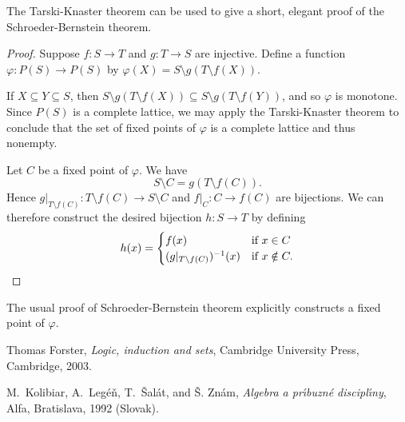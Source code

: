 \documentclass[12pt]{article}
\begin{document}
The Tarski-Knaster theorem can be used to give a short, elegant proof of the Schroeder-Bernstein theorem.

\begin{proof}
Suppose $f:S\to T$ and $g:T\to S$ are injective.  Define a function $\varphi\colon P(S)\to P(S)$
by $\varphi(X)=S\setminus g(T\setminus f(X))$.

If $X\subseteq Y\subseteq S$, then $S\setminus g(T\setminus f(X))\subseteq S\setminus g(T\setminus f(Y))$, and so $\varphi$ is monotone.  Since $P(S)$ is a complete lattice, we may apply the Tarski-Knaster theorem to conclude that the set of fixed points of $\varphi$ is a complete lattice and thus nonempty.

Let $C$ be a fixed point of $\varphi$.  We have
\[
S\setminus C=g(T\setminus f(C)).
\]
Hence $g|_{T\setminus f(C)}\colon T\setminus f(C)\to S\setminus C$
and $f|_C:C\to f(C)$ are bijections.  We can therefore construct the desired bijection $h\colon S\to T$ by defining
\[
h(x)=\begin{cases}
f(x)                           & \text{if\ }x\in C \\
(g|_{T\setminus f(C)})^{-1}(x) & \text{if\ }x\notin C.\qedhere
\end{cases}
\]
\end{proof}

The usual proof of Schroeder-Bernstein theorem explicitly constructs a fixed point of $\varphi$.

\begin{thebibliography}{1}
Thomas Forster, \emph{{Logic, induction and sets}}, {Cambridge University Press}, Cambridge, 2003.

M.~Kolibiar, A.~Leg\'e\v{n}, T.~\v{S}al\'at, and \v{S}. Zn\'am, \emph{Algebra a pr\'\i buzn\'e discipl\'\i ny}, Alfa, Bratislava, 1992 (Slovak).
\end{thebibliography}
\end{document}
